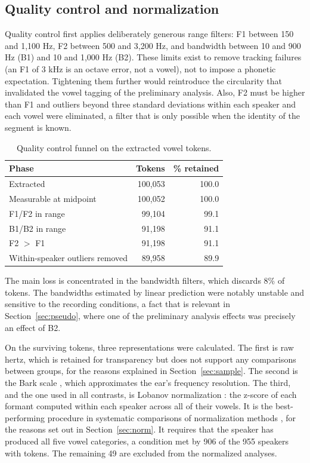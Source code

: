 \documentclass[11pt]{article}
\begin{document}
\subsection{Quality control and normalization}
\label{sec:qc}

Quality control first applies deliberately generous range filters: F1 between 150
and 1,100 Hz, F2 between 500 and 3,200 Hz, and bandwidth between 10 and 900 Hz
(B1) and 10 and 1,000 Hz (B2). These limits exist to remove tracking failures (an
F1 of 3 kHz is an octave error, not a vowel), not to impose a phonetic
expectation. Tightening them further would reintroduce the circularity that
invalidated the vowel tagging of the preliminary analysis. Also, F2 must be
higher than F1 and outliers beyond three standard deviations within each speaker
and each vowel were eliminated, a filter that is only possible when the identity
of the segment is known.

\begin{table}[t]
\centering
\small
\begin{tabular}{lrr}
\toprule
Phase & Tokens & \% retained \\
\midrule
Extracted                        & 100,053 & 100.0 \\
Measurable at midpoint           & 100,052 & 100.0 \\
F1/F2 in range                   &  99,104 &  99.1 \\
B1/B2 in range                   &  91,198 &  91.1 \\
F2 $>$ F1                        &  91,198 &  91.1 \\
Within-speaker outliers removed  &  89,958 &  89.9 \\
\bottomrule
\end{tabular}
\caption{Quality control funnel on the extracted vowel tokens.}
\label{tab:qc}
\end{table}

The main loss is concentrated in the bandwidth filters, which discards 8\% of
tokens. The bandwidths estimated by linear prediction were notably unstable and
sensitive to the recording conditions, a fact that is relevant in
Section~\ref{sec:pseudo}, where one of the preliminary analysis effects was
precisely an effect of B2.

On the surviving tokens, three representations were calculated. The first is raw
hertz, which is retained for transparency but does not support any comparisons
between groups, for the reasons explained in Section~\ref{sec:sample}. The second
is the Bark scale \citep{traunmuller1990}, which approximates the ear's frequency
resolution. The third, and the one used in all contrasts, is Lobanov
normalization \citep{lobanov1971}: the z-score of each formant computed within
each speaker across all of their vowels. It is the best-performing procedure in
systematic comparisons of normalization methods \citep{adank2004}, for the
reasons set out in Section~\ref{sec:norm}. It requires that the speaker has
produced all five vowel categories, a condition met by 906 of the 955 speakers
with tokens. The remaining 49 are excluded from the normalized analyses.
\end{document}

